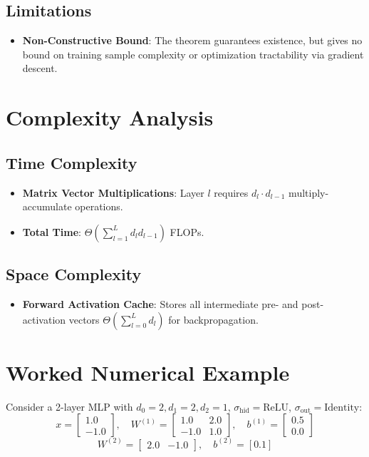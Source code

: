 \documentclass[11pt,a4paper]{article}
\theoremstyle{definition}
\begin{document}
\subsection{Limitations}
\begin{itemize}
    \item \textbf{Non-Constructive Bound}: The theorem guarantees existence, but gives no bound on training sample complexity or optimization tractability via gradient descent.
\end{itemize}

\section{Complexity Analysis}

\subsection{Time Complexity}
\begin{itemize}
    \item \textbf{Matrix Vector Multiplications}: Layer $l$ requires $d_l \cdot d_{l-1}$ multiply-accumulate operations.
    \item \textbf{Total Time}: $\Theta\left( \sum_{l=1}^L d_l d_{l-1} \right)$ FLOPs.
\end{itemize}

\subsection{Space Complexity}
\begin{itemize}
    \item \textbf{Forward Activation Cache}: Stores all intermediate pre- and post-activation vectors $\Theta\left( \sum_{l=0}^L d_l \right)$ for backpropagation.
\end{itemize}

\section{Worked Numerical Example}

Consider a 2-layer MLP with $d_0 = 2, d_1 = 2, d_2 = 1$, $\sigma_{\text{hid}} = \text{ReLU}$, $\sigma_{\text{out}} = \text{Identity}$:
\begin{equation}
x = \begin{bmatrix} 1.0 \\ -1.0 \end{bmatrix}, \quad W^{(1)} = \begin{bmatrix} 1.0 & 2.0 \\ -1.0 & 1.0 \end{bmatrix}, \quad b^{(1)} = \begin{bmatrix} 0.5 \\ 0.0 \end{bmatrix}
\end{equation}
\begin{equation}
W^{(2)} = \begin{bmatrix} 2.0 & -1.0 \end{bmatrix}, \quad b^{(2)} = [0.1]
\end{equation}
\end{document}
